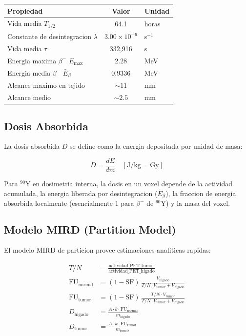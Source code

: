 \documentclass[12pt,a4paper]{article}
\begin{document}
\begin{table}[H]
\centering
\begin{tabular}{l c l}
\toprule
\textbf{Propiedad} & \textbf{Valor} & \textbf{Unidad} \\
\midrule
Vida media $T_{1/2}$ & 64.1 & horas \\
Constante de desintegracion $\lambda$ & $3.00 \times 10^{-6}$ & s$^{-1}$ \\
Vida media $\tau$ & 332,916 & s \\
Energia maxima $\beta^-$ $E_{\max}$ & 2.28 & MeV \\
Energia media $\beta^-$ $\bar{E}_\beta$ & 0.9336 & MeV \\
Alcance maximo en tejido & $\sim 11$ & mm \\
Alcance medio & $\sim 2.5$ & mm \\
\bottomrule
\end{tabular}
\end{table}

\subsection{Dosis Absorbida}

La dosis absorbida $D$ se define como la energia depositada por unidad de masa:

\begin{equation}\label{eq:dosis}
    D = \frac{dE}{dm} \quad [\text{J/kg} = \text{Gy}]
\end{equation}

Para $^{90}$Y en dosimetria interna, la dosis en un voxel depende de la actividad acumulada,
la energia liberada por desintegracion ($\bar{E}_\beta$), la fraccion de energia absorbida
localmente (esencialmente 1 para $\beta^-$ de $^{90}$Y) y la masa del voxel.

\subsection{Modelo MIRD (Partition Model)}

El modelo MIRD de particion provee estimaciones analiticas rapidas:

\begin{align}
    T/N &= \frac{\text{actividad\_PET\_tumor}}{\text{actividad\_PET\_higado}} \\
    \text{FU}_{\text{normal}} &= (1 - \text{SF})\,
          \frac{V_{\text{higado}}}{T/N \cdot V_{\text{tumor}} + V_{\text{higado}}} \\
    \text{FU}_{\text{tumor}} &= (1 - \text{SF})\,
          \frac{T/N \cdot V_{\text{tumor}}}{T/N \cdot V_{\text{tumor}} + V_{\text{higado}}} \\
    D_{\text{higado}} &= \frac{A \cdot k \cdot \text{FU}_{\text{normal}}}{m_{\text{higado}}} \\
    D_{\text{tumor}} &= \frac{A \cdot k \cdot \text{FU}_{\text{tumor}}}{m_{\text{tumor}}}
\end{align}
\end{document}
